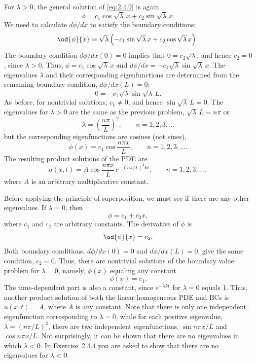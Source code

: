 For $\lambda > 0$, the general solution of \eqref{eq:2.4.9} is again
\begin{equation}
\label{eq:2.4.12}
\phi = c_1\cos\sqrt{\lambda}\,x + c_2\sin\sqrt{\lambda}\,x.
\end{equation}
We need to calculate $d\phi/dx$ to satisfy the boundary conditions:
\begin{equation}
\label{eq:2.4.13}
\od{\phi}{x} = \sqrt{\lambda}\left(-c_1\sin\sqrt{\lambda}\,x + c_2\cos\sqrt{\lambda}\,x\right).
\end{equation}
The boundary condition $d\phi/dx(0) = 0$ implies that $0 = c_2\sqrt{\lambda}$, and hence $c_2 = 0$, since $\lambda > 0$. Thus, $\phi = c_1\cos\sqrt{\lambda}\,x$ and $d\phi/dx = -c_1\sqrt{\lambda}\sin\sqrt{\lambda}\,x$. The eigenvalues $\lambda$ and their corresponding eigenfunctions are determined from the remaining boundary condition, $d\phi/dx(L) = 0$:
\[
0 = -c_1\sqrt{\lambda}\sin\sqrt{\lambda}\,L.
\]
As before, for nontrivial solutions, $c_1 \ne 0$, and hence $\sin\sqrt{\lambda}\,L = 0$. The eigenvalues for $\lambda > 0$ are the same as the previous problem, $\sqrt{\lambda}\,L = n\pi$ or
\begin{equation}
\label{eq:2.4.14}
\lambda = \left(\frac{n\pi}{L}\right)^2, \qquad n = 1, 2, 3, \ldots
\end{equation}
but the corresponding eigenfunctions are cosines (not sines),
\begin{equation}
\label{eq:2.4.15}
\phi(x) = c_1\cos\frac{n\pi x}{L}, \qquad n = 1, 2, 3, \ldots.
\end{equation}
The resulting product solutions of the PDE are
\begin{equation}
\label{eq:2.4.16}
u(x,t) = A\cos\frac{n\pi x}{L}\,e^{-(n\pi/L)^2 kt}, \qquad n = 1, 2, 3, \ldots,
\end{equation}
where $A$ is an arbitrary multiplicative constant.

Before applying the principle of superposition, we must see if there are any other eigenvalues. If $\lambda = 0$, then
\begin{equation}
\label{eq:2.4.17}
\phi = c_1 + c_2 x,
\end{equation}
where $c_1$ and $c_2$ are arbitrary constants. The derivative of $\phi$ is
\[
\od{\phi}{x} = c_2.
\]
Both boundary conditions, $d\phi/dx(0) = 0$ and $d\phi/dx(L) = 0$, give the same condition, $c_2 = 0$. Thus, there are nontrivial solutions of the boundary value problem for $\lambda = 0$, namely, $\phi(x)$ equaling any constant
\begin{equation}
\label{eq:2.4.18}
\phi(x) = c_1.
\end{equation}
The time-dependent part is also a constant, since $e^{-\lambda kt}$ for $\lambda = 0$ equals 1. Thus, another product solution of both the linear homogeneous PDE and BCs is $u(x,t) = A$, where $A$ is any constant. Note that there is only one independent eigenfunction corresponding to $\lambda = 0$, while for each positive eigenvalue, $\lambda = (n\pi/L)^2$, there are two independent eigenfunctions, $\sin n\pi x/L$ and $\cos n\pi x/L$. Not surprisingly, it can be shown that there are no eigenvalues in which $\lambda < 0$. In Exercise~2.4.4 you are asked to show that there are no eigenvalues for $\lambda < 0$.

